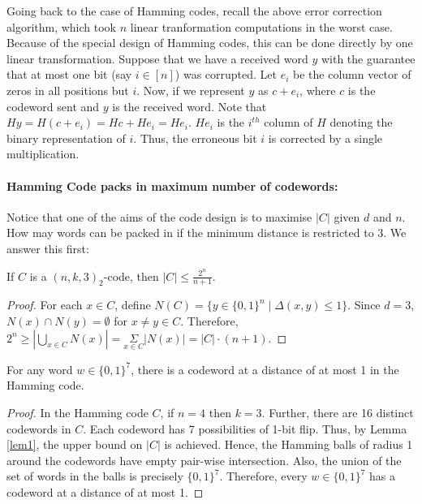 Going back to the case of Hamming codes, recall the above error correction algorithm, which took $n$ linear tranformation computations in the worst case. Because of the special design of Hamming codes, this can be done directly by one linear transformation. Suppose that we have a received word $y$ with the guarantee that at most one bit (say $i \in [n]$) was corrupted. Let $e_i$ be the column vector of zeros in all positions but $i$. Now, if we represent $y$ as $c +e_i$, where $c$ is the codeword sent and $y$ is the received word. Note that $Hy=H(c+e_i)=Hc+He_i=He_i$. $He_i$ is the $i^{th}$ column of $H$ denoting the binary representation of $i$. Thus, the erroneous bit $i$ is corrected by a single multiplication.

\paragraph{Hamming Code packs in maximum number of codewords:}
Notice that one of the aims of the code design is to maximise $|C|$ given $d$ and $n$. How may words can be packed in if the minimum distance is restricted to $3$. We answer this first:

\begin{lemma}
If $C$ is a $(n,k,3)_2$-code, then $|C| \leq \frac{2^n}{n+1}$.
\label{lem1}
\end{lemma}
\begin{proof}
For each $x \in C$, define $N(C)=\{y \in \{0,1\}^n \mid \Delta(x,y) \leq 1\}$. Since $d=3$, $N(x) \cap N(y) =\emptyset$ for $x \neq y \in C$. Therefore, $2^n \geq |\underset{x \in C}\bigcup N(x)|= \underset{x \in C}\Sigma |N(x)|=|C| \cdot (n+1)$.
\end{proof}
\begin{corollary}For any word $w \in \{0,1\}^7$, there is a codeword at a distance of at most 1 in the Hamming code.
\end{corollary}
\begin{proof}In the Hamming code $C$, if $n=4$ then $k=3$. Further, there are 16 distinct codewords in $C$. Each codeword has 7 possibilities of 1-bit flip. Thus, by Lemma \ref{lem1}, the upper bound on $|C|$ is achieved. Hence, the Hamming balls of radius 1 around the codewords have empty pair-wise intersection. Also, the union of the set of words in the balls is precisely $\{0,1\}^7$. 
Therefore, every $w \in \{0,1\}^7$ has a codeword at a distance of at most 1.
\end{proof}

